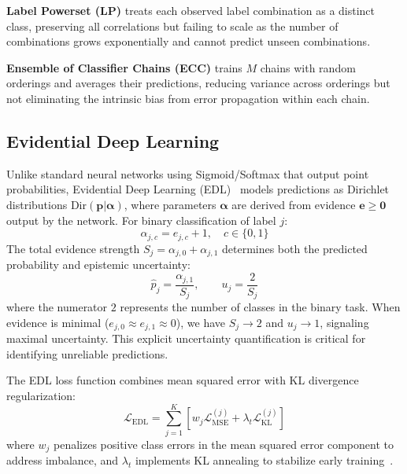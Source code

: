 \documentclass[conference]{IEEEtran}
\begin{document}
\textbf{Label Powerset (LP)} treats each observed label combination as a distinct class, preserving all correlations but failing to scale as the number of combinations grows exponentially and cannot predict unseen combinations.

\textbf{Ensemble of Classifier Chains (ECC)} trains $M$ chains with random orderings and averages their predictions, reducing variance across orderings but not eliminating the intrinsic bias from error propagation within each chain.

\subsection{Evidential Deep Learning}

Unlike standard neural networks using Sigmoid/Softmax that output point probabilities, Evidential Deep Learning (EDL)~\cite{sensoy2018evidential} models predictions as Dirichlet distributions $\mathrm{Dir}(\mathbf{p}|\boldsymbol{\alpha})$, where parameters $\boldsymbol{\alpha}$ are derived from evidence $\mathbf{e} \ge \mathbf{0}$ output by the network. For binary classification of label $j$:
\begin{equation}
    \alpha_{j,c} = e_{j,c} + 1, \quad c \in \{0, 1\}
\end{equation}
The total evidence strength $S_j = \alpha_{j,0} + \alpha_{j,1}$ determines both the predicted probability and epistemic uncertainty:
\begin{equation}
    \hat{p}_j = \frac{\alpha_{j,1}}{S_j}, \qquad u_j = \frac{2}{S_j}
    \label{eq:edl_outputs}
\end{equation}
where the numerator $2$ represents the number of classes in the binary task. When evidence is minimal ($e_{j,0} \approx e_{j,1} \approx 0$), we have $S_j \to 2$ and $u_j \to 1$, signaling maximal uncertainty. This explicit uncertainty quantification is critical for identifying unreliable predictions.

The EDL loss function combines mean squared error with KL divergence regularization:
\begin{equation}
    \mathcal{L}_{\mathrm{EDL}} = \sum_{j=1}^{K} \left[ w_j \mathcal{L}_{\mathrm{MSE}}^{(j)} + \lambda_t \mathcal{L}_{\mathrm{KL}}^{(j)} \right]
    \label{eq:edl_loss_compact}
\end{equation}
where $w_j$ penalizes positive class errors in the mean squared error component to address imbalance, and $\lambda_t$ implements KL annealing to stabilize early training~\cite{sensoy2018evidential}.
\end{document}
